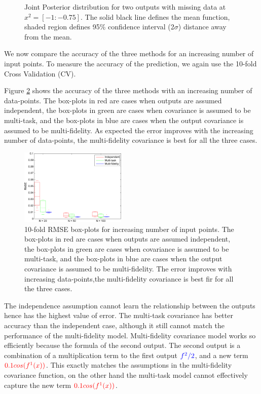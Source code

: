 \begin{figure}[!ht]
       \caption{Joint Posterior distribution for two outputs with missing data at $x^2 = [-1:-0.75]$. The solid black line defines the mean function, shaded region defines 95\% confidence interval (2$\sigma$) distance away from the mean.}
       \label{figJointPosteriorDistribution}
\end{figure}

\begin{mdframed}[hidealllines=true,backgroundcolor=lightgray!20]
We now compare the accuracy of the three methods for an increasing number of input points. To measure the accuracy of the prediction, we again use the 10-fold Cross Validation (CV).   

Figure \ref{subFigboxPlotsToyDataJoint} shows the accuracy of the three methods with an increasing number of data-points. The box-plots in red are cases when outputs are assumed independent, the box-plots in green are cases when covariance is assumed to be multi-task, and the box-plots in blue are cases when the output covariance is assumed to be multi-fidelity. As expected the error improves with the increasing number of data-points, the multi-fidelity covariance is best for all the three cases.
\end{mdframed}

\begin{figure}[!ht]
  \centering
    
        \includegraphics[width=0.45\textwidth]
        {images/part3/boxPlotsToyDataProgressionOverTime}
        \caption{10-fold RMSE box-plots for increasing number of input points. The box-plots in red are cases when outputs are assumed independent, the box-plots in green are cases when covariance is assumed to be multi-task, and the box-plots in blue are cases when the output covariance is assumed to be multi-fidelity. The error improves with increasing data-points,the multi-fidelity covariance is best fir for all the three cases.}
        \label{subFigboxPlotsToyDataJoint}
\end{figure}

The independence assumption cannot learn the relationship between the outputs hence has the highest value of error. The multi-task covariance has better accuracy than the independent case, although it still cannot match the performance of the multi-fidelity model.  Multi-fidelity covariance model works so efficiently because the formula of the second output. The second output is a combination of a multiplication term to the first output $\textcolor{blue}{f^2/2}$, and a new term $\textcolor{red}{0.1cos(f^{1}(x))}$. This exactly matches the assumptions in the multi-fidelity covariance function, on the other hand the multi-task model cannot effectively capture the new term $\textcolor{red}{0.1cos(f^{1}(x))}$.

